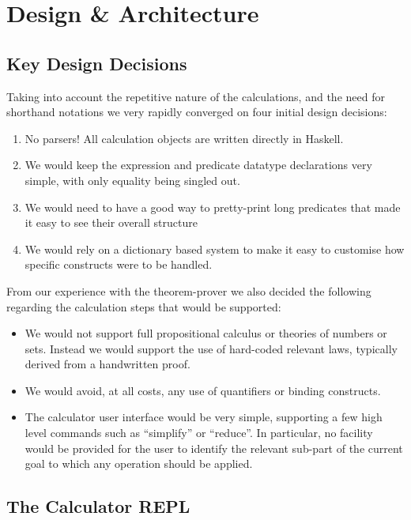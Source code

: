 \section{Design \& Architecture}\label{sec:Design}

\subsection{Key Design Decisions}

Taking into account the repetitive nature of the calculations,
and the need for shorthand notations we very rapidly converged
on four initial design decisions:
\begin{enumerate}
  \item No parsers! All calculation objects are written
  directly in Haskell.
  \item We would keep the expression and predicate datatype declarations
   very simple, with only equality being singled out.
  \item We would need to have a good way to pretty-print long predicates
    that made it easy to see their overall structure
  \item We would rely on a dictionary based system to
    make it easy to customise how specific constructs
    were to be handled.
\end{enumerate}
From our experience with the  theorem-prover we also decided
the following regarding the calculation steps that would be supported:
\begin{itemize}
  \item
    We would not support full  propositional calculus
    or theories of numbers or sets.
    Instead we would support the use of hard-coded relevant laws,
    typically derived from  a handwritten proof.
  \item
    We would avoid, at all costs,
    any use of quantifiers or binding constructs.
  \item
    The calculator user interface would be very simple,
    supporting a few high level commands such as ``simplify''
    or ``reduce''.
    In particular,
    no facility would be provided for the user to identify
    the relevant sub-part of the current goal to which any operation
    should be applied.
\end{itemize}

\subsection{The Calculator REPL}

